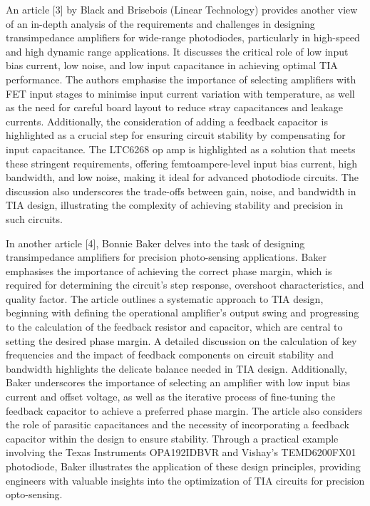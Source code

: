 \documentclass[conference]{IEEEtran}
\begin{document}
An article [3] by Black and Brisebois (Linear Technology) provides another view of an in-depth analysis of the requirements and challenges in designing transimpedance amplifiers for wide-range photodiodes, particularly in high-speed and high dynamic range applications. It discusses the critical role of low input bias current, low noise, and low input capacitance in achieving optimal TIA performance. The authors emphasise the importance of selecting amplifiers with FET input stages to minimise input current variation with temperature, as well as the need for careful board layout to reduce stray capacitances and leakage currents. Additionally, the consideration of adding a feedback capacitor is highlighted as a crucial step for ensuring circuit stability by compensating for input capacitance. The LTC6268 op amp is highlighted as a solution that meets these stringent requirements, offering femtoampere-level input bias current, high bandwidth, and low noise, making it ideal for advanced photodiode circuits. The discussion also underscores the trade-offs between gain, noise, and bandwidth in TIA design, illustrating the complexity of achieving stability and precision in such circuits.

In another article [4], Bonnie Baker delves into the task of designing transimpedance amplifiers for precision photo-sensing applications. Baker emphasises the importance of achieving the correct phase margin, which is required for determining the circuit’s step response, overshoot characteristics, and quality factor. The article outlines a systematic approach to TIA design, beginning with defining the operational amplifier's output swing and progressing to the calculation of the feedback resistor and capacitor, which are central to setting the desired phase margin. A detailed discussion on the calculation of key frequencies and the impact of feedback components on circuit stability and bandwidth highlights the delicate balance needed in TIA design. Additionally, Baker underscores the importance of selecting an amplifier with low input bias current and offset voltage, as well as the iterative process of fine-tuning the feedback capacitor to achieve a preferred phase margin. The article also considers the role of parasitic capacitances and the necessity of incorporating a feedback capacitor within the design to ensure stability. Through a practical example involving the Texas Instruments OPA192IDBVR and Vishay's TEMD6200FX01 photodiode, Baker illustrates the application of these design principles, providing engineers with valuable insights into the optimization of TIA circuits for precision opto-sensing.\\
\end{document}
